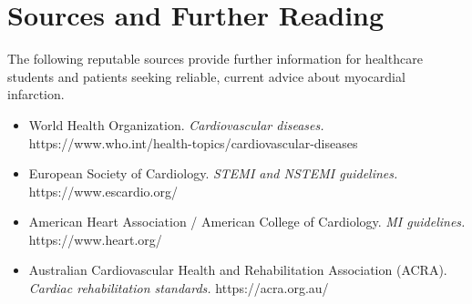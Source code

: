 \section*{Sources and Further Reading}
The following reputable sources provide further information for healthcare students and patients seeking reliable, current advice about myocardial infarction.

\begin{itemize}
    \item World Health Organization. \textit{Cardiovascular diseases.} https://www.who.int/health-topics/cardiovascular-diseases
    \item European Society of Cardiology. \textit{STEMI and NSTEMI guidelines.} https://www.escardio.org/
    \item American Heart Association / American College of Cardiology. \textit{MI guidelines.} https://www.heart.org/
    \item Australian Cardiovascular Health and Rehabilitation Association (ACRA). \textit{Cardiac rehabilitation standards.} https://acra.org.au/
\end{itemize}
